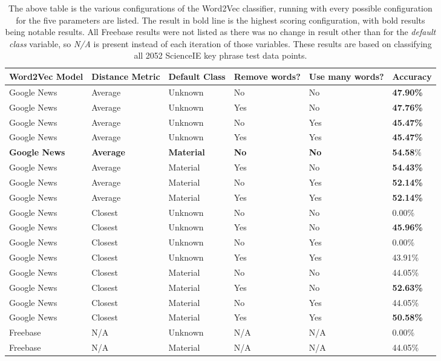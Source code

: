 \begin{table}
	\centering
	\begin{tabular}{ C{2.5cm} | C{2cm} | C{2cm} | C{2cm} | C{2cm} | C{2cm} }
		\textbf{Word2Vec Model} & \textbf{Distance Metric} & \textbf{Default Class} & \textbf{Remove words?} & \textbf{Use many words?} & \textbf{Accuracy} \\
		\hline
		Google News & Average & Unknown & No & No & \textbf{47.90\%} \\
		Google News & Average & Unknown & Yes & No & \textbf{47.76\%} \\
		Google News & Average & Unknown & No & Yes & \textbf{45.47\%} \\
		Google News & Average & Unknown & Yes & Yes & \textbf{45.47\%} \\
		\textbf{Google News} & \textbf{Average} & \textbf{Material} & \textbf{No} & \textbf{No} & \textbf{54.58}\% \\
		Google News & Average & Material & Yes & No & \textbf{54.43\%} \\
		Google News & Average & Material & No & Yes & \textbf{52.14\%} \\
		Google News & Average & Material & Yes & Yes  & \textbf{52.14\%} \\
		Google News & Closest & Unknown & No & No & 0.00\% \\
		Google News & Closest & Unknown & Yes & No & \textbf{45.96\%} \\
		Google News & Closest & Unknown & No & Yes & 0.00\% \\
		Google News & Closest & Unknown & Yes & Yes & 43.91\% \\
		Google News & Closest & Material & No & No & 44.05\% \\
		Google News & Closest & Material & Yes & No & \textbf{52.63\%} \\
		Google News & Closest & Material & No & Yes & 44.05\% \\
		Google News & Closest & Material & Yes & Yes & \textbf{50.58\%} \\
		Freebase & N/A & Unknown & N/A & N/A & 0.00\% \\
		Freebase & N/A & Material & N/A & N/A & 44.05\% \\
	\end{tabular}
	\caption[Word2Vec Classification Results]{The above table is the various configurations of the Word2Vec classifier, running with every possible configuration for the five parameters are listed. The result in bold line is the highest scoring configuration, with bold results being notable results. All Freebase results were not listed as there was no change in result other than for the \textit{default class} variable, so \textit{N/A} is present instead of each iteration of those variables. These results are based on classifying all 2052 ScienceIE key phrase test data points.}
	\label{table:classresults}
\end{table}

